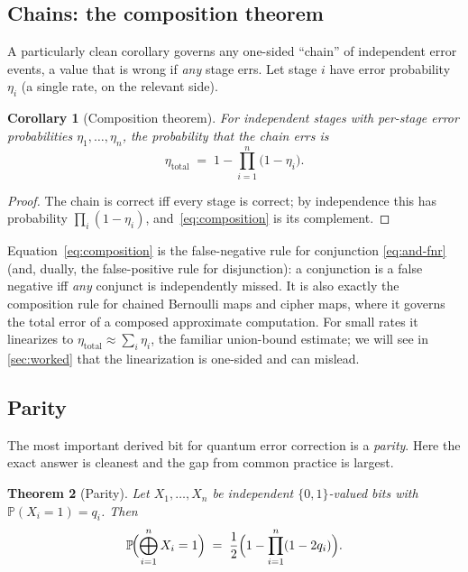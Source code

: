 \documentclass[12pt]{article}
\numberwithin{equation}{section}
\theoremstyle{plain}
\newtheorem{theorem}{Theorem}[section]
\newtheorem{corollary}[theorem]{Corollary}
\theoremstyle{definition}
\theoremstyle{remark}
\newcommand{\Prob}{\mathbb{P}}
\newcommand{\bits}{\{0,1\}}
\newcommand{\bigxor}{\bigoplus}
\begin{document}
\subsection{Chains: the composition theorem}

A particularly clean corollary governs any one-sided ``chain'' of independent
error events, a value that is wrong if \emph{any} stage errs. Let stage $i$
have error probability $\eta_i$ (a single rate, on the relevant side).

\begin{corollary}[Composition theorem]
\label{cor:composition}
For independent stages with per-stage error probabilities $\eta_1,\dots,\eta_n$,
the probability that the chain errs is
\begin{equation}
\label{eq:composition}
  \eta_{\mathrm{total}} \;=\; 1 - \prod_{i=1}^{n}\bigl(1-\eta_i\bigr).
\end{equation}
\end{corollary}

\begin{proof}
The chain is correct iff every stage is correct; by independence this has
probability $\prod_i(1-\eta_i)$, and~\eqref{eq:composition} is its complement.
\end{proof}

Equation~\eqref{eq:composition} is the false-negative rule for conjunction
\eqref{eq:and-fnr} (and, dually, the false-positive rule for disjunction): a
conjunction is a false negative iff \emph{any} conjunct is independently missed.
It is also exactly the composition rule for chained Bernoulli maps and cipher
maps, where it governs the total error of a composed approximate computation. For
small rates it linearizes to $\eta_{\mathrm{total}}\approx\sum_i\eta_i$, the
familiar union-bound estimate; we will see in \cref{sec:worked} that the
linearization is one-sided and can mislead.

\subsection{Parity}

The most important derived bit for quantum error correction is a \emph{parity}.
Here the exact answer is cleanest and the gap from common practice is largest.

\begin{theorem}[Parity]
\label{thm:parity}
Let $X_1,\dots,X_n$ be independent $\bits$-valued bits with
$\Prob(X_i=1)=q_i$. Then
\begin{equation}
\label{eq:parity}
  \Prob\!\Bigl(\bigxor_{i=1}^{n} X_i = 1\Bigr)
  \;=\; \frac12\Bigl(1 - \prod_{i=1}^{n}(1-2q_i)\Bigr).
\end{equation}
\end{theorem}
\end{document}

